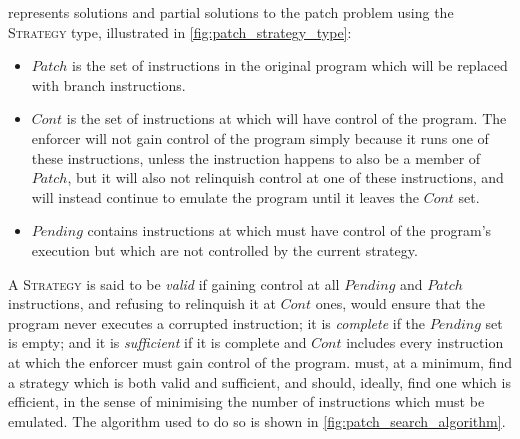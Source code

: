 {\Implementation} represents solutions and partial solutions to the
patch problem using the \textsc{Strategy} type, illustrated in
\autoref{fig:patch_strategy_type}:
\begin{itemize}
\item $\mathit{Patch}$ is the set of instructions in the original
  program which will be replaced with branch instructions.
\item $\mathit{Cont}$ is the set of instructions at which
  {\implementation} will have control of the program.  The enforcer
  will not gain control of the program simply because it runs one of
  these instructions, unless the instruction happens to also be a
  member of $\mathit{Patch}$, but it will also not relinquish control
  at one of these instructions, and will instead continue to emulate
  the program until it leaves the $\mathit{Cont}$ set.
\item $\mathit{Pending}$ contains instructions at which
  {\implementation} must have control of the program's execution but
  which are not controlled by the current strategy.
\end{itemize}
A \textsc{Strategy} is said to be \emph{valid} if gaining control at
all $\mathit{Pending}$ and $\mathit{Patch}$ instructions, and refusing
to relinquish it at $\mathit{Cont}$ ones, would ensure that the
program never executes a corrupted instruction; it is \emph{complete}
if the $\mathit{Pending}$ set is empty; and it is \emph{sufficient} if
it is complete and $\mathit{Cont}$ includes every instruction at which
the enforcer must gain control of the program.  {\Implementation}
must, at a minimum, find a strategy which is both valid and
sufficient, and should, ideally, find one which is efficient, in the
sense of minimising the number of instructions which must be emulated.
The algorithm used to do so is shown in
\autoref{fig:patch_search_algorithm}.

